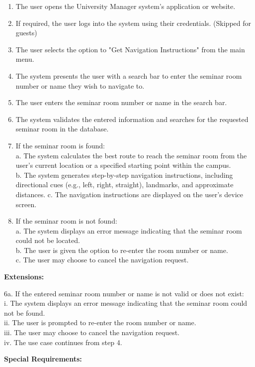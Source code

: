 \documentclass[conference,onecolumn]{IEEEtran}
\begin{document}
\begin{framed}
	\begin{enumerate}
		\item The user opens the University Manager system's application or website.
		\item If required, the user logs into the system using their credentials. (Skipped for guests)
		\item The user selects the option to "Get Navigation Instructions" from the main menu.
		\item The system presents the user with a search bar to enter the seminar room number or name they wish to navigate to.
		\item The user enters the seminar room number or name in the search bar.
		\item The system validates the entered information and searches for the requested seminar room in the database.
		\item If the seminar room is found:\\
		a. The system calculates the best route to reach the seminar room from the user's current location or a specified starting point within the campus.\\
		b. The system generates step-by-step navigation instructions, including directional cues (e.g., left, right, straight), landmarks, and approximate distances.
		c. The navigation instructions are displayed on the user's device screen.
		\item If the seminar room is not found:\\
		a. The system displays an error message indicating that the seminar room could not be located.\\
		b. The user is given the option to re-enter the room number or name.\\
		c. The user may choose to cancel the navigation request.
	\end{enumerate}
	
	\textbf{Extensions:}
	
	6a. If the entered seminar room number or name is not valid or does not exist:\\
	i. The system displays an error message indicating that the seminar room could not be found.\\
	ii. The user is prompted to re-enter the room number or name.\\
	iii. The user may choose to cancel the navigation request.\\
	iv. The use case continues from step 4.
	
	\textbf{Special Requirements:}
	

\end{framed}
\end{document}
